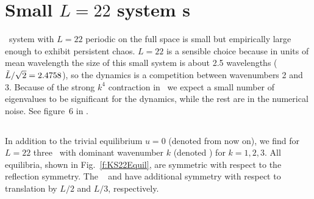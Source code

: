 %


\section{Small $L=22$ system {\rpo s}}
\label{s:L22}


\KS\ system with $L = 22$ periodic on the full space is small but
empirically large enough to exhibit persistent chaos.  $L=22$ is a
sensible choice because in units of mean wavelength the size of this
small system is about 2.5 wavelengths ($\tilde{L}/\sqrt{2}= 2.4758$),
so the dynamics is a competition between wavenumbers 2 and 3.
Because of the strong $k^4$ contraction in \KS\ we expect a small
number of eigenvalues to be significant for the dynamics, while the
rest are in the numerical noise. See figure~6 in
.


\subsection{\Eqva}

In addition to the trivial equilibrium $u=0$ (denoted  from now
on), we find for $L = 22$ three \eqva\ with dominant wavenumber $k$
(denoted ) for $k = 1, 2, 3$.  All equilibria, shown in
Fig.~\ref{f:KS22Equil}, are symmetric with respect to the reflection
symmetry. The \eqva\  and  have additional symmetry with respect
to translation by $L/2$ and $L/3$, respectively.

